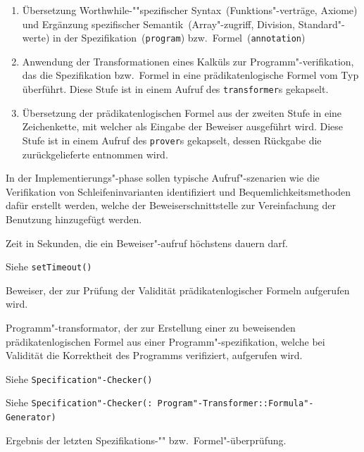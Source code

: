 \begin{enumerate}%

    \item Übersetzung Worthwhile-""spezifischer
    Syntax~(Funktions"-verträge, Axiome) und Ergänzung spezifischer
    Semantik~(Array"-zugriff, Division, Standard"-werte) in der
    Spezifikation~(\texttt{program}) bzw.\
    Formel~(\texttt{annotation})%

    \item Anwendung der Transformationen eines Kalküls zur
    Programm"-verifikation, das die Spezifikation bzw.\ Formel in eine
    prädikatenlogische Formel vom Typ \type{AST::Expression}
    überführt. Diese Stufe ist in einem Aufruf des
    \texttt{transformer}s gekapselt.%

    \item Übersetzung der prädikatenlogischen Formel aus der zweiten
    Stufe in eine Zeichenkette, mit welcher als Eingabe der Beweiser
    ausgeführt wird. Diese Stufe ist in einem Aufruf des
    \texttt{prover}s gekapselt, dessen Rückgabe die zurückgelieferte
    \type{Validity} entnommen wird.%

\end{enumerate}%

In der Implementierungs"-phase sollen typische Aufruf"-szenarien wie
die Verifikation von Schleifeninvarianten identifiziert und
Bequemlichkeitsmethoden dafür erstellt werden, welche der
Beweiserschnittstelle zur Vereinfachung der Benutzung hinzugefügt
werden.%

\begin{description}%

    Zeit in Sekunden, die ein Beweiser"-aufruf höchstens dauern darf.%

    Siehe \texttt{setTimeout()}%


    Beweiser, der zur Prüfung der Validität prädikatenlogischer
    Formeln aufgerufen wird.%


    Programm"-transformator, der zur Erstellung einer zu beweisenden
    prädikatenlogischen Formel aus einer Programm"-spezifikation,
    welche bei Validität die Korrektheit des Programms verifiziert,
    aufgerufen wird.%

    Siehe \texttt{Specification"-Checker()}%

    Siehe \texttt{Specification"-Checker(: Program"-Transformer::Formula"-Generator)}%


    Ergebnis der letzten Spezifikations-"" bzw.\ Formel"-überprüfung.%

\end{description}%

